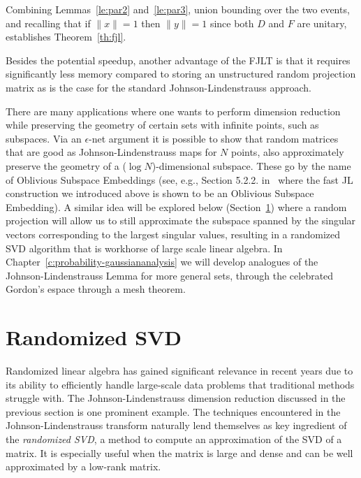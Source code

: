 Combining Lemmas~\ref{le:par2} and~\ref{le:par3}, union bounding over the two events, and recalling that if $\|x\|=1$ then $\|y\|=1$ since both $D$ and $F$ are unitary, establishes Theorem~\ref{th:fjl}.

Besides the potential speedup, another advantage of the FJLT  is that it requires significantly less memory  compared to storing an unstructured random projection matrix as is the case for the standard Johnson-Lindenstrauss approach. 






There are many applications where one wants to perform dimension reduction while preserving the geometry of certain sets with infinite points, such as subspaces. Via an $\epsilon$-net argument it is possible to show that random matrices that are good as Johnson-Lindenstrauss maps for $N$ points, also approximately preserve the geometry of a ($\log N$)-dimensional subspace. These go by the name of Oblivious Subspace Embeddings (see, e.g., Section 5.2.2. in~\cite{KireevaTropp} where the fast JL construction we introduced above is shown to be an Oblivious Subspace Embedding). A similar idea will be explored below (Section~\ref{s:RSVD}) where a random projection will allow us to still approximate the subspace spanned by the singular vectors corresponding to the largest singular values, resulting in a randomized SVD algorithm that is workhorse of large scale linear algebra. In Chapter~\ref{c:probability-gaussiananalysis} we will develop analogues of the Johnson-Lindenstrauss Lemma for more general sets,  through the celebrated Gordon's espace through a mesh theorem.



\section{Randomized SVD}\label{s:RSVD}

Randomized linear algebra has gained significant relevance in recent years due to its ability to efficiently handle large-scale data problems that traditional methods struggle with.  
The Johnson-Lindenstrauss dimension reduction discussed in the previous section is one prominent example. The techniques encountered in the Johnson-Lindenstrauss transform naturally lend themselves as key ingredient of the \emph{randomized SVD},  a method to compute an approximation of the SVD of a matrix. It is especially useful when the matrix is large and dense and can be well approximated by a low-rank matrix. 

